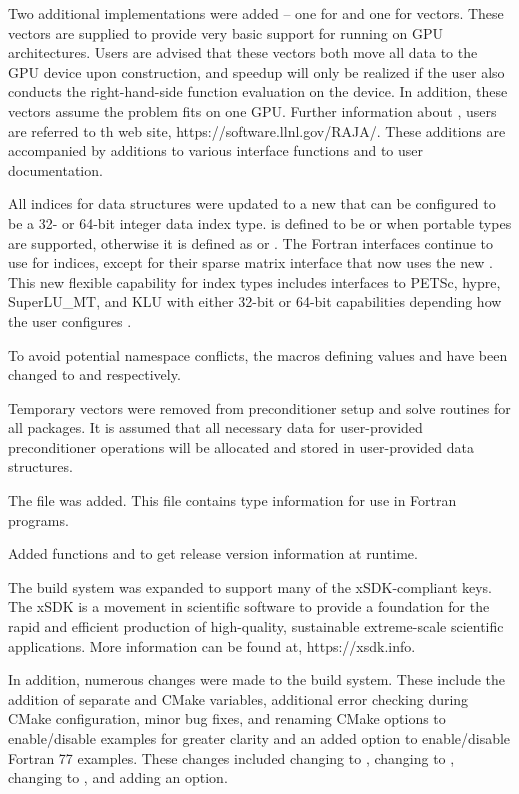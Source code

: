 Two additional {\nvector} implementations were added -- one for
{\cuda} and one for {\raja} vectors.
These vectors are supplied to provide very basic support for running
on GPU architectures.  Users are advised that these vectors both move all data
to the GPU device upon construction, and speedup will only be realized if the
user also conducts the right-hand-side function evaluation on the device.
In addition, these vectors assume the problem fits on one GPU.
Further information about {\raja}, users are referred to th web site,
https://software.llnl.gov/RAJA/.
These additions are accompanied by additions to various interface functions
and to user documentation.

All indices for data structures were updated to a new  that
can be configured to be a 32- or 64-bit integer data index type.
 is defined to be  or  when portable types are
supported, otherwise it is defined as  or .
The Fortran interfaces continue to use  for indices, except for
their sparse matrix interface that now uses the new .
This new flexible capability for index types includes interfaces to
PETSc, hypre, SuperLU\_MT, and KLU with
either 32-bit or 64-bit capabilities depending how the user configures
{\sundials}.

To avoid potential namespace conflicts, the macros defining 
values  and  have been changed to  and
 respectively.

Temporary vectors were removed from preconditioner setup and solve
routines for all packages.  It is assumed that all necessary data
for user-provided preconditioner operations will be allocated and
stored in user-provided data structures.

The file  was added. This file contains
{\sundials} type information for use in Fortran programs.

Added functions  and  to
get {\sundials} release version information at runtime.

The build system was expanded to support many of the xSDK-compliant keys.
The xSDK is a movement in scientific software to provide a foundation for the
rapid and efficient production of high-quality,
sustainable extreme-scale scientific applications.  More information can
be found at, https://xsdk.info.

In addition, numerous changes were made to the build system.
These include the addition of separate  and 
CMake variables, additional error checking during CMake configuration,
minor bug fixes, and renaming CMake options to enable/disable examples
for greater clarity and an added option to enable/disable Fortran 77 examples.
These changes included changing  to ,
changing  to , changing  to
, and adding an  option.

